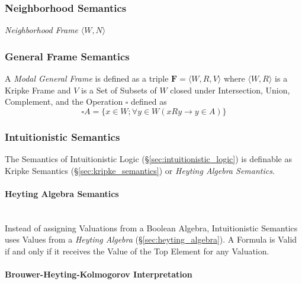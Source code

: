 \subsubsection{Neighborhood Semantics}
\label{sec:neighborhood_semantics}

\emph{Neighborhood Frame} $\langle W, N \rangle$



\subsubsection{General Frame Semantics}
\label{sec:general_frame_semantics}

A \emph{Modal General Frame} is defined as a triple $\mathbf{F} =
\langle W,R,V \rangle$ where $\langle W,R \rangle$ is a Kripke Frame
and $V$ is a Set of Subsets of $W$ closed under Intersection, Union,
Complement, and the Operation $\square$ defined as
\[
    \square A = \{x \in W; \forall y \in W ( x R y \rightarrow y \in A ) \}
\]



\subsubsection{Intuitionistic Semantics}
\label{sec:intuitionistic_semantics}

The Semantics of Intuitionistic Logic
(\S\ref{sec:intuitionistic_logic}) is definable as Kripke Semantics
(\S\ref{sec:kripke_semantics}) or \emph{Heyting Algebra Semantics}.



\paragraph{Heyting Algebra Semantics}\label{sec:heyting_semantics}
\hfill \\

Instead of assigning Valuations from a Boolean Algebra, Intuitionistic
Semantics uses Values from a \emph{Heyting Algebra}
(\S\ref{sec:heyting_algebra}). A Formula is Valid if and only if it
receives the Value of the Top Element for any Valuation.



\paragraph{Brouwer-Heyting-Kolmogorov Interpretation}
\label{sec:brouwer-heyting-kolmogorov}
\hfill \\

